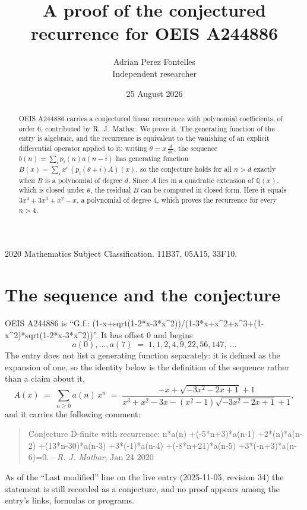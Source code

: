 \documentclass[11pt,a4paper]{article}
\title{A proof of the conjectured recurrence for OEIS A244886}
\author{Adrian Perez Fontelles\\ \small Independent researcher}
\date{25 August 2026}
\theoremstyle{plain}
\theoremstyle{definition}
\begin{document}
\maketitle

\begin{abstract}
OEIS A244886 carries a conjectured linear recurrence with polynomial coefficients, of
order 6, contributed by R.~J.~Mathar. We prove it. The generating function of the
entry is algebraic, and the recurrence is equivalent to the vanishing of an explicit
differential operator applied to it: writing $\theta=x\,\frac{d}{dx}$, the sequence
$b(n)=\sum_{i}p_{i}(n)a(n-i)$ has generating function
$B(x)=\sum_{i}x^{i}\,(p_{i}(\theta+i)A)(x)$, so the conjecture holds for all $n>d$ exactly
when $B$ is a polynomial of degree $d$. Since $A$ lies in a quadratic extension of
$\mathbb{Q}(x)$, which is closed under $\theta$, the residual $B$ can be computed in
closed form. Here it equals $3 x^{4} + 3 x^{3} + x^{2} - x$, a polynomial of degree $4$, which proves
the recurrence for every $n>4$.
\end{abstract}

\noindent\small 2020 Mathematics Subject Classification. 11B37, 05A15, 33F10.\normalsize

\section{The sequence and the conjecture}

OEIS A244886 is ``G.f.: (1-x+sqrt(1-2*x-3*x\^{}2))/(1-3*x+x\^{}2+x\^{}3+(1-x\^{}2)*sqrt(1-2*x-3*x\^{}2))''. It has offset $0$ and begins
\[
a(0),\dots,a(7)\;=\;1, 1, 2, 4, 9, 22, 56, 147,\ \dots
\]
The entry does not list a generating function separately: it is defined as the
expansion of one, so the identity below is the definition of the sequence rather than a
claim about it,
\begin{equation}\label{eq:gf}
A(x)\;=\;\sum_{n\ge 0} a(n)\,x^{n}\;=\;\frac{- x + \sqrt{- 3 x^{2} - 2 x + 1} + 1}{x^{3} + x^{2} - 3 x - \left(x^{2} - 1\right) \sqrt{- 3 x^{2} - 2 x + 1} + 1} ,
\end{equation}
and it carries the following comment:
\begin{quote}\small
Conjecture D-finite with recurrence: n*a(n) +(-5*n+3)*a(n-1) +2*(n)*a(n-2) +(13*n-30)*a(n-3) +3*(-1)*a(n-4) +(-8*n+21)*a(n-5) +3*(-n+3)*a(n-6)=0. - \emph{R. J. Mathar}, Jan 24 2020
\end{quote}
As of the ``Last modified'' line on the live entry (2025-11-05, revision 34) the
statement is still recorded as a conjecture, and no proof appears among the entry's links,
formulas or programs.
\end{document}
